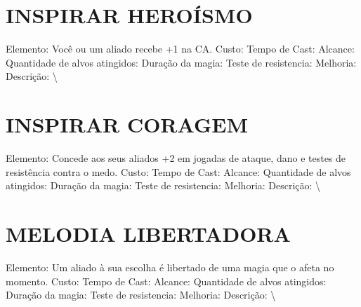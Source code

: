 \documentclass{article}%
\begin{document}
%
\section{INSPIRAR HEROÍSMO}%
\label{sec:INSPIRARHEROSMO}%
Elemento: Você ou um aliado recebe +1 na CA.\newline%
Custo: \newline%
Tempo de Cast: \newline%
Alcance: \newline%
Quantidade de alvos atingidos: \newline%
Duração da magia: \newline%
Teste de resistencia: \newline%
Melhoria: \newline%
Descrição: \textbackslash{}

%
\section{INSPIRAR CORAGEM}%
\label{sec:INSPIRARCORAGEM}%
Elemento: Concede aos seus aliados +2 em jogadas de ataque, dano e testes de resistência contra o medo.\newline%
Custo: \newline%
Tempo de Cast: \newline%
Alcance: \newline%
Quantidade de alvos atingidos: \newline%
Duração da magia: \newline%
Teste de resistencia: \newline%
Melhoria: \newline%
Descrição: \textbackslash{}

%
\section{MELODIA LIBERTADORA}%
\label{sec:MELODIALIBERTADORA}%
Elemento: Um aliado à sua escolha é libertado de uma magia que o afeta no momento.\newline%
Custo: \newline%
Tempo de Cast: \newline%
Alcance: \newline%
Quantidade de alvos atingidos: \newline%
Duração da magia: \newline%
Teste de resistencia: \newline%
Melhoria: \newline%
Descrição: \textbackslash{}
\end{document}
